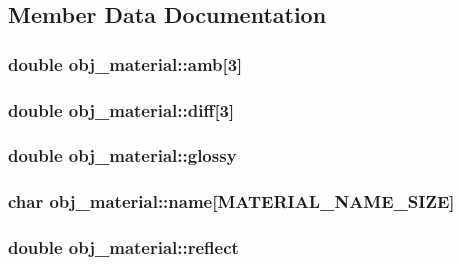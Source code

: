 \subsection{Member Data Documentation}
\hypertarget{structobj__material_a0127f4464e685658f8bf9db697688f8d}{
\subsubsection[{amb}]{\setlength{\rightskip}{0pt plus 5cm}double obj\+\_\+material\+::amb\mbox{[}3\mbox{]}}}\label{structobj__material_a0127f4464e685658f8bf9db697688f8d}
\hypertarget{structobj__material_a6f9b724555e48815e800b4f82c291f19}{
\subsubsection[{diff}]{\setlength{\rightskip}{0pt plus 5cm}double obj\+\_\+material\+::diff\mbox{[}3\mbox{]}}}\label{structobj__material_a6f9b724555e48815e800b4f82c291f19}
\hypertarget{structobj__material_a9d648bad424ee96576ed2a2f2e604da6}{
\subsubsection[{glossy}]{\setlength{\rightskip}{0pt plus 5cm}double obj\+\_\+material\+::glossy}}\label{structobj__material_a9d648bad424ee96576ed2a2f2e604da6}
\hypertarget{structobj__material_a22c868555082c2637cef0515b5a7ca6b}{
\subsubsection[{name}]{\setlength{\rightskip}{0pt plus 5cm}char obj\+\_\+material\+::name\mbox{[}{\bf M\+A\+T\+E\+R\+I\+A\+L\+\_\+\+N\+A\+M\+E\+\_\+\+S\+I\+Z\+E}\mbox{]}}}\label{structobj__material_a22c868555082c2637cef0515b5a7ca6b}
\hypertarget{structobj__material_a4763ba95918c9bf5256b79e3603adc58}{
\subsubsection[{reflect}]{\setlength{\rightskip}{0pt plus 5cm}double obj\+\_\+material\+::reflect}}\label{structobj__material_a4763ba95918c9bf5256b79e3603adc58}
